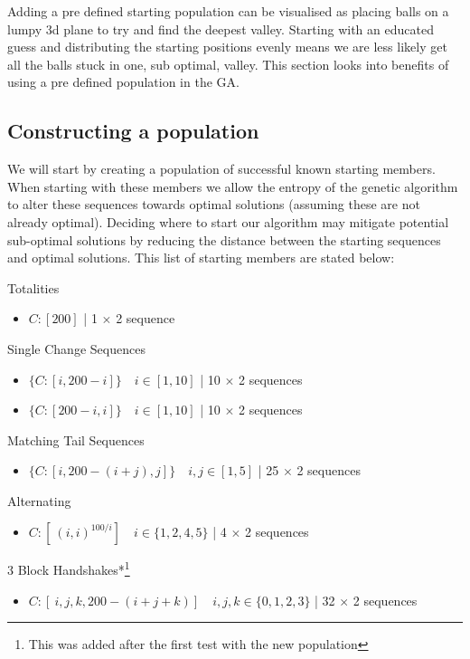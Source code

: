 Adding a pre defined starting population can be visualised as placing balls on a lumpy 3d plane to try and find the deepest valley.
Starting with an educated guess and distributing the starting positions evenly means we are less likely get all the balls stuck in one, sub optimal, valley.
This section looks into benefits of using a pre defined population in the GA.

\subsection{Constructing a population}
We will start by creating a population of successful known starting members.
When starting with these members we allow the entropy of the genetic algorithm to alter these sequences towards optimal solutions (assuming these are not already optimal).
Deciding where to start our algorithm may mitigate potential sub-optimal solutions by reducing the distance between the starting sequences and optimal solutions.
This list of starting members are stated below:

Totalities
\begin{itemize}
    \item \(C:[200]\) | 1 $\times$ 2 sequence 
\end{itemize}

Single Change Sequences
\begin{itemize}
    \item \(\{C:[i,200-i]\} \quad i\in [1,10]\) | 10 $\times$ 2 sequences
    \item \(\{C:[200-i,i]\} \quad i\in [1,10]\) | 10 $\times$ 2 sequences
\end{itemize}

Matching Tail Sequences
\begin{itemize}
    \item \(\{C:[i,200-(i+j),j]\} \quad i,j \in [1,5]\) | 25 $\times$ 2 sequences
\end{itemize}

Alternating
\begin{itemize}
    \item \(C:[\ (i,i)^{100/i}] \quad i \in \{1,2,4,5\}\) | 4 $\times$ 2 sequences
\end{itemize}

3 Block Handshakes*\footnote{This was added after the first test with the new population}
\begin{itemize}
    \item \(C:[\ i,j,k,200-(i+j+k)] \quad i,j,k \in \{0,1,2,3\}\) | 32 $\times$ 2 sequences
\end{itemize}

